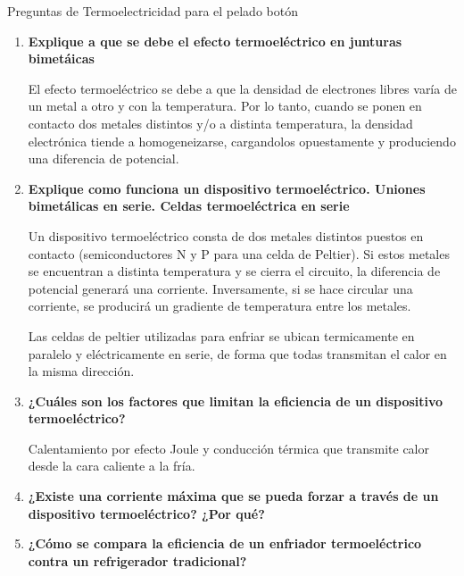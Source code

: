 \documentclass[a4paper,10pt,fleqn,oneside]{article}
\begin{document}


\bigskip
\noindent
\centering
Preguntas de Termoelectricidad para el pelado botón


\begin{enumerate}[1.]
	\item \textbf{Explique a que se debe el efecto termoeléctrico en junturas bimetáicas}

	El efecto termoeléctrico se debe a que la densidad de electrones libres varía de un metal a otro y con la temperatura. Por lo tanto, cuando se ponen en contacto dos metales distintos y/o a distinta temperatura, la densidad electrónica tiende a homogeneizarse, cargandolos opuestamente y produciendo una diferencia de potencial.

	\item \textbf{Explique como funciona un dispositivo termoeléctrico. Uniones bimetálicas en serie. Celdas termoeléctrica en serie}
	
	Un dispositivo termoeléctrico consta de dos metales distintos puestos en contacto (semiconductores N y P para una celda de Peltier). Si estos metales se encuentran a distinta temperatura y se cierra el circuito, la diferencia de potencial generará una corriente. Inversamente, si se hace circular una corriente, se producirá un gradiente de temperatura entre los metales. 
	
	Las celdas de peltier utilizadas para enfriar se ubican termicamente en paralelo y eléctricamente en serie, de forma que todas transmitan el calor en la misma dirección.
	
	\item \textbf{¿Cuáles son los factores que limitan la eficiencia de un dispositivo termoeléctrico?}
	
	Calentamiento por efecto Joule y conducción térmica que transmite calor desde la cara caliente a la fría.
	
	\item \textbf{¿Existe una corriente máxima que se pueda forzar a través de un dispositivo termoeléctrico? ¿Por qué?}
	
	\item \textbf{¿Cómo se compara la eficiencia de un enfriador termoeléctrico contra un refrigerador tradicional?}
	

\end{enumerate}
\end{document}
